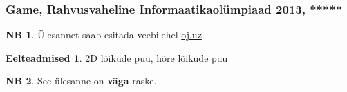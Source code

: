 \documentclass{trkut}
\theoremstyle{definition}
\newtheorem*{prereq}{Eelteadmised}
\newtheorem*{extra}{NB}
\begin{document}
\begin{kk}[H]%
    \caption{Näidisimplementatsioon ülesandele Bubble Sort 2}%
    \label{EMaxx}%
    \end{kk}

\subsubsection{Game, Rahvusvaheline Informaatikaolümpiaad 2013,  *****}
\begin{extra}
Ülesannet saab esitada veebilehel \href{https://oj.uz/problem/view/IOI13_game}{oj.uz}.
\end{extra}
\begin{prereq}
2D lõikude puu, hõre lõikude puu
\end{prereq}
\begin{extra}
See ülesanne on \textbf{väga} raske.
\end{extra}
\end{document}
